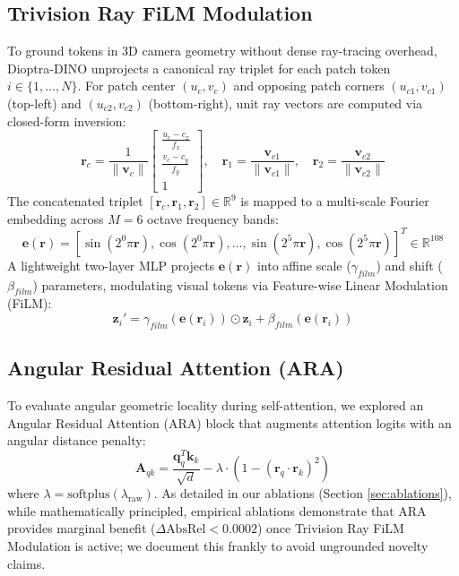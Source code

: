 \documentclass[10pt,twocolumn,letterpaper]{article}
\begin{document}
\subsection{Trivision Ray FiLM Modulation}
To ground tokens in 3D camera geometry without dense ray-tracing overhead, Dioptra-DINO unprojects a canonical ray triplet for each patch token $i \in \{1, \dots, N\}$. For patch center $(u_c, v_c)$ and opposing patch corners $(u_{c1}, v_{c1})$ (top-left) and $(u_{c2}, v_{c2})$ (bottom-right), unit ray vectors are computed via closed-form inversion:
\begin{equation}
\mathbf{r}_c = \frac{1}{\|\mathbf{v}_c\|} \begin{bmatrix} \frac{u_c - c_x}{f_x} \\ \frac{v_c - c_y}{f_y} \\ 1 \end{bmatrix}, \quad \mathbf{r}_1 = \frac{\mathbf{v}_{c1}}{\|\mathbf{v}_{c1}\|}, \quad \mathbf{r}_2 = \frac{\mathbf{v}_{c2}}{\|\mathbf{v}_{c2}\|}
\end{equation}
The concatenated triplet $[\mathbf{r}_c, \mathbf{r}_1, \mathbf{r}_2] \in \mathbb{R}^9$ is mapped to a multi-scale Fourier embedding across $M=6$ octave frequency bands:
\begin{equation}
\mathbf{e}(\mathbf{r}) = \left[ \sin(2^0 \pi \mathbf{r}), \cos(2^0 \pi \mathbf{r}), \dots, \sin(2^5 \pi \mathbf{r}), \cos(2^5 \pi \mathbf{r}) \right]^T \in \mathbb{R}^{108}
\end{equation}
A lightweight two-layer MLP projects $\mathbf{e}(\mathbf{r})$ into affine scale ($\gamma_{film}$) and shift ($\beta_{film}$) parameters, modulating visual tokens via Feature-wise Linear Modulation (FiLM):
\begin{equation}
\mathbf{z}_i' = \gamma_{film}(\mathbf{e}(\mathbf{r}_i)) \odot \mathbf{z}_i + \beta_{film}(\mathbf{e}(\mathbf{r}_i))
\end{equation}

\subsection{Angular Residual Attention (ARA)}
To evaluate angular geometric locality during self-attention, we explored an Angular Residual Attention (ARA) block that augments attention logits with an angular distance penalty:
\begin{equation}
\mathbf{A}_{qk} = \frac{\mathbf{q}_q^T \mathbf{k}_k}{\sqrt{d}} - \lambda \cdot (1 - (\mathbf{r}_q \cdot \mathbf{r}_k)^2)
\end{equation}
where $\lambda = \text{softplus}(\lambda_{\text{raw}})$. As detailed in our ablations (Section \ref{sec:ablations}), while mathematically principled, empirical ablations demonstrate that ARA provides marginal benefit ($\Delta \text{AbsRel} < 0.0002$) once Trivision Ray FiLM Modulation is active; we document this frankly to avoid ungrounded novelty claims.
\end{document}
